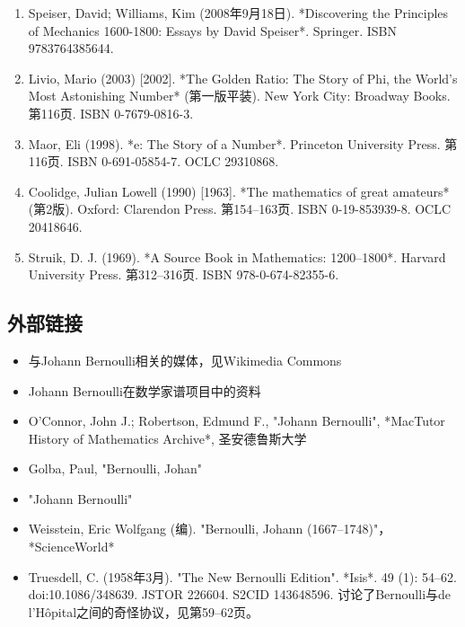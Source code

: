 \begin{enumerate}
\item Speiser, David; Williams, Kim (2008年9月18日). *Discovering the Principles of Mechanics 1600-1800: Essays by David Speiser*. Springer. ISBN 9783764385644.  
\item Livio, Mario (2003) [2002]. *The Golden Ratio: The Story of Phi, the World's Most Astonishing Number* (第一版平装). New York City: Broadway Books. 第116页. ISBN 0-7679-0816-3.  
\item Maor, Eli (1998). *e: The Story of a Number*. Princeton University Press. 第116页. ISBN 0-691-05854-7. OCLC 29310868.  
\item Coolidge, Julian Lowell (1990) [1963]. *The mathematics of great amateurs* (第2版). Oxford: Clarendon Press. 第154–163页. ISBN 0-19-853939-8. OCLC 20418646.  
\item Struik, D. J. (1969). *A Source Book in Mathematics: 1200–1800*. Harvard University Press. 第312–316页. ISBN 978-0-674-82355-6.
\end{enumerate}
\subsection{外部链接}  
\begin{itemize}
\item 与Johann Bernoulli相关的媒体，见Wikimedia Commons  
\item Johann Bernoulli在数学家谱项目中的资料  
\item O'Connor, John J.; Robertson, Edmund F., "Johann Bernoulli", *MacTutor History of Mathematics Archive*, 圣安德鲁斯大学  
\item Golba, Paul, "Bernoulli, Johan"  
\item "Johann Bernoulli"  
\item Weisstein, Eric Wolfgang (编). "Bernoulli, Johann (1667–1748)"，*ScienceWorld*  
\item Truesdell, C. (1958年3月). "The New Bernoulli Edition". *Isis*. 49 (1): 54–62. doi:10.1086/348639. JSTOR 226604. S2CID 143648596. 讨论了Bernoulli与de l'Hôpital之间的奇怪协议，见第59–62页。
\end{itemize}